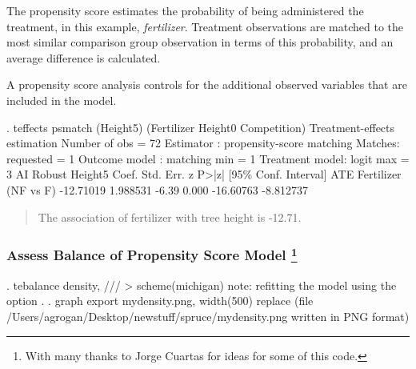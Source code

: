 \documentclass[
]{article}
\begin{document}
The propensity score estimates the probability of being administered the
treatment, in this example, \emph{fertilizer}. Treatment observations
are matched to the most similar comparison group observation in terms of
this probability, and an average difference is calculated.

A propensity score analysis controls for the additional observed
variables that are included in the model.

\begin{stlog}
. teffects psmatch (Height5) (Fertilizer Height0 Competition)
{\smallskip}
Treatment-effects estimation                   Number of obs      =         72
Estimator      : propensity-score matching     Matches: requested =          1
Outcome model  : matching                                     min =          1
Treatment model: logit                                        max =          3
             {\VBAR}              AI Robust
     Height5 {\VBAR}      Coef.   Std. Err.      z    P>|z|     [95\% Conf. Interval]
ATE          {\VBAR}
  Fertilizer {\VBAR}
  (NF vs F)  {\VBAR}  -12.71019   1.988531    -6.39   0.000    -16.60763   -8.812737
\end{stlog}



\begin{quote}
The association of fertilizer with tree height is -12.71.
\end{quote}

\hypertarget{assess-balance-of-propensity-score-model-cuartas}{%
\subsubsection[Assess Balance of Propensity Score Model
]{\texorpdfstring{Assess Balance of Propensity Score Model \footnote{With
  many thanks to Jorge Cuartas for ideas for some of this code.}}{Assess Balance of Propensity Score Model }}\label{assess-balance-of-propensity-score-model-cuartas}}

\begin{stlog}
. tebalance density, ///
> scheme(michigan)
note: refitting the model using the {} option
{\smallskip}
. 
. graph export mydensity.png, width(500) replace
(file /Users/agrogan/Desktop/newstuff/spruce/mydensity.png written in PNG format)
\end{stlog}
\end{document}
